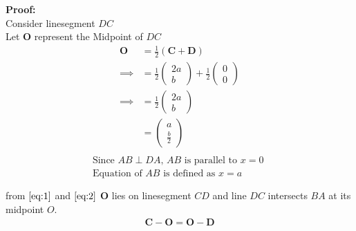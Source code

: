 \documentclass{article}
\newcommand{\myvec}[1]{\ensuremath{\begin{pmatrix}#1\end{pmatrix}}}
\let\vec\mathbf
\begin{document}
\textbf{Proof:}\\
Consider linesegment $DC$\\
Let $\vec{O}$ represent the Midpoint of $DC$
\begin{align}
	\vec{O}&=\frac{1}{2}(\vec{C}+\vec{D})\\
	\implies &= \frac{1}{2}\myvec{2a\\b}+\frac{1}{2}\myvec{0\\0}\\
	\implies &= \frac{1}{2}\myvec{2a\\b}\\
		 &=\myvec{a\\\frac{b}{2}}
		 \label{eq:1}\\
\end{align}
\begin{align}
	\text { Since $AB\perp DA$, $AB$ is parallel to $x=0$ }\\
	\text { Equation of $AB$ is defined as $x=a$}\\
	\label{eq:2}\\
\end{align}
from $\eqref{eq:1}$ and $\eqref{eq:2}$
$\vec{O}$ lies on linesegment $CD$ and line $DC$ intersects $BA$ at its midpoint $O$.
\begin{align}
\vec{C}-\vec{O}=\vec{O}-\vec{D}
\end{align}
\end{document}

